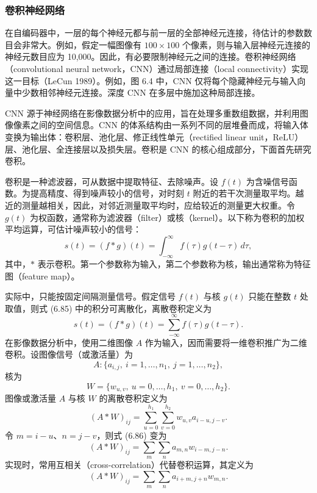 \subsubsection{卷积神经网络}

在自编码器中，一层的每个神经元都与前一层的全部神经元连接，待估计的参数数目会非常大。例如，假定一幅图像有 $100\times100$ 个像素，则与输入层神经元连接的神经元数目应为 10,000。因此，有必要限制神经元之间的连接。卷积神经网络（convolutional neural network，CNN）通过局部连接（local connectivity）实现这一目标（LeCun 1989）。例如，图 6.4 中，CNN 仅将每个隐藏神经元与输入向量中少数相邻神经元连接。深度 CNN 在多层中施加这种局部连接。


CNN 源于神经网络在影像数据分析中的应用，旨在处理多重数组数据，并利用图像像素之间的空间信息。CNN 的体系结构由一系列不同的层堆叠而成，将输入体变换为输出体：卷积层、池化层、修正线性单元（rectified linear unit，ReLU）层、池化层、全连接层以及损失层。卷积是 CNN 的核心组成部分，下面首先研究卷积。


卷积是一种滤波器，可从数据中提取特征、去除噪声。设 $f(t)$ 为含噪信号函数。为提高精度、得到噪声较小的信号，对时刻 $t$ 附近的若干次测量取平均。越近的测量越相关，因此，对邻近测量取平均时，应给较近的测量更大权重。令 $g(t)$ 为权函数，通常称为滤波器（filter）或核（kernel）。以下称为卷积的加权平均运算，可估计噪声较小的信号：
\begin{equation}
s(t)=(f*g)(t)=\int_{-\infty}^{\infty}f(\tau)g(t-\tau)\,d\tau,
\tag{6.85}
\end{equation}
其中，$*$ 表示卷积。第一个参数称为输入，第二个参数称为核，输出通常称为特征图（feature map）。

实际中，只能按固定间隔测量信号。假定信号 $f(t)$ 与核 $g(t)$ 只能在整数 $t$ 处取值，则式 (6.85) 中的积分可离散化，离散卷积定义为
\begin{equation}
s(t)=(f*g)(t)=\sum_{-\infty}^{\infty}f(\tau)g(t-\tau).
\tag{6.86}
\end{equation}
在影像数据分析中，使用二维图像 $A$ 作为输入，因而需要将一维卷积推广为二维卷积。设图像信号（或激活量）为
\[
A:\{a_{i,j},\ i=1,\ldots,n_1,\ j=1,\ldots,n_2\},
\]
核为
\[
W=\{w_{u,v},\ u=0,\ldots,h_1,\ v=0,\ldots,h_2\}.
\]
图像或激活量 $A$ 与核 $W$ 的离散卷积定义为
\begin{equation}
(A*W)_{ij}=\sum_{u=0}^{h_1}\sum_{v=0}^{h_2}w_{u,v}a_{i-u,j-v}.
\tag{6.87}
\end{equation}
令 $m=i-u$、$n=j-v$，则式 (6.86) 变为
\begin{equation}
(A*W)_{ij}=\sum_m\sum_na_{m,n}w_{i-m,j-n}.
\tag{6.88}
\end{equation}
实现时，常用互相关（cross-correlation）代替卷积运算，其定义为
\begin{equation}
(A*W)_{ij}=\sum_m\sum_na_{i+m,j+n}w_{m,n}.
\tag{6.89}
\end{equation}

